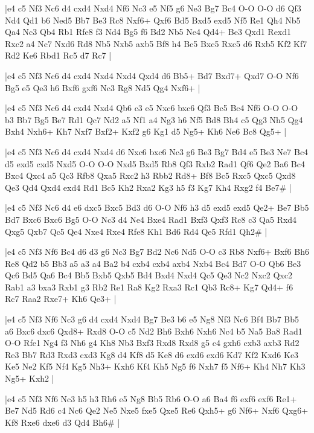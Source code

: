 \whitename{}
\blackname{}
\makegametitle
|e4 c5 Nf3 Nc6 d4 cxd4 Nxd4 Nf6 Nc3 e5 Nf5 g6 Ne3 Bg7 Bc4 O-O O-O d6 Qf3 Nd4 Qd1 b6 Ned5 Bb7 Be3 Rc8 Nxf6+ Qxf6 Bd5 Bxd5 exd5 Nf5 Re1 Qh4 Nb5 Qa4 Nc3 Qb4 Rb1 Rfe8 f3 Nd4 Bg5 f6 Bd2 Nb5 Ne4 Qd4+ Be3 Qxd1 Rexd1 Rxc2 a4 Nc7 Nxd6 Rd8 Nb5 Nxb5 axb5 Bf8 h4 Bc5 Bxc5 Rxc5 d6 Rxb5 Kf2 Kf7 Rd2 Ke6 Rbd1 Rc5 d7 Rc7  |

\whitename{}
\blackname{}
\makegametitle
|e4 c5 Nf3 Nc6 d4 cxd4 Nxd4 Nxd4 Qxd4 d6 Bb5+ Bd7 Bxd7+ Qxd7 O-O Nf6 Bg5 e5 Qe3 h6 Bxf6 gxf6 Nc3 Rg8 Nd5 Qg4 Nxf6+  |

\whitename{}
\blackname{}
\makegametitle
|e4 c5 Nf3 Nc6 d4 cxd4 Nxd4 Qb6 c3 e5 Nxc6 bxc6 Qf3 Bc5 Bc4 Nf6 O-O O-O b3 Bb7 Bg5 Be7 Rd1 Qc7 Nd2 a5 Nf1 a4 Ng3 h6 Nf5 Bd8 Bh4 c5 Qg3 Nh5 Qg4 Bxh4 Nxh6+ Kh7 Nxf7 Bxf2+ Kxf2 g6 Kg1 d5 Ng5+ Kh6 Ne6 Bc8 Qg5+  |

\whitename{}
\blackname{}
\makegametitle
|e4 c5 Nf3 Nc6 d4 cxd4 Nxd4 d6 Nxc6 bxc6 Nc3 g6 Be3 Bg7 Bd4 e5 Be3 Ne7 Bc4 d5 exd5 cxd5 Nxd5 O-O O-O Nxd5 Bxd5 Rb8 Qf3 Rxb2 Rad1 Qf6 Qe2 Ba6 Bc4 Bxc4 Qxc4 a5 Qc3 Rfb8 Qxa5 Rxc2 h3 Rbb2 Rd8+ Bf8 Bc5 Rxc5 Qxc5 Qxd8 Qe3 Qd4 Qxd4 exd4 Rd1 Bc5 Kh2 Rxa2 Kg3 h5 f3 Kg7 Kh4 Rxg2 f4 Be7\#  |

\whitename{}
\blackname{}
\makegametitle
|e4 c5 Nf3 Nc6 d4 e6 dxc5 Bxc5 Bd3 d6 O-O Nf6 h3 d5 exd5 exd5 Qe2+ Be7 Bb5 Bd7 Bxc6 Bxc6 Bg5 O-O Nc3 d4 Ne4 Bxe4 Rad1 Bxf3 Qxf3 Rc8 c3 Qa5 Rxd4 Qxg5 Qxb7 Qc5 Qe4 Nxe4 Rxe4 Rfe8 Kh1 Bd6 Rd4 Qe5 Rfd1 Qh2\#  |

\whitename{}
\blackname{}
\makegametitle
|e4 c5 Nf3 Nf6 Bc4 d6 d3 g6 Nc3 Bg7 Bd2 Nc6 Nd5 O-O c3 Rb8 Nxf6+ Bxf6 Bh6 Re8 Qd2 b5 Bb3 a5 a3 a4 Ba2 b4 cxb4 cxb4 axb4 Nxb4 Bc4 Bd7 O-O Qb6 Be3 Qc6 Bd5 Qa6 Bc4 Bb5 Bxb5 Qxb5 Bd4 Bxd4 Nxd4 Qc5 Qe3 Nc2 Nxc2 Qxc2 Rab1 a3 bxa3 Rxb1 g3 Rb2 Re1 Ra8 Kg2 Rxa3 Rc1 Qb3 Rc8+ Kg7 Qd4+ f6 Rc7 Raa2 Rxe7+ Kh6 Qe3+  |

\whitename{}
\blackname{}
\makegametitle
|e4 c5 Nf3 Nf6 Nc3 g6 d4 cxd4 Nxd4 Bg7 Be3 b6 e5 Ng8 Nf3 Nc6 Bf4 Bb7 Bb5 a6 Bxc6 dxc6 Qxd8+ Rxd8 O-O c5 Nd2 Bh6 Bxh6 Nxh6 Nc4 b5 Na5 Ba8 Rad1 O-O Rfe1 Ng4 f3 Nh6 g4 Kh8 Nb3 Bxf3 Rxd8 Rxd8 g5 c4 gxh6 cxb3 axb3 Rd2 Re3 Bb7 Rd3 Rxd3 cxd3 Kg8 d4 Kf8 d5 Ke8 d6 exd6 exd6 Kd7 Kf2 Kxd6 Ke3 Ke5 Ne2 Kf5 Nf4 Kg5 Nh3+ Kxh6 Kf4 Kh5 Ng5 f6 Nxh7 f5 Nf6+ Kh4 Nh7 Kh3 Ng5+ Kxh2  |

\whitename{}
\blackname{}
\makegametitle
|e4 c5 Nf3 Nf6 Nc3 h5 h3 Rh6 e5 Ng8 Bb5 Rb6 O-O a6 Ba4 f6 exf6 exf6 Re1+ Be7 Nd5 Rd6 c4 Nc6 Qe2 Ne5 Nxe5 fxe5 Qxe5 Re6 Qxh5+ g6 Nf6+ Nxf6 Qxg6+ Kf8 Rxe6 dxe6 d3 Qd4 Bh6\#  |

